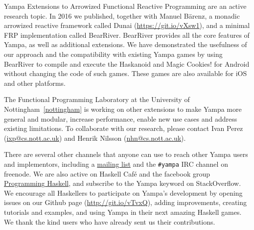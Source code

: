 \begin{hcarentry}[updated]{Yampa}
Extensions to Arrowized Functional Reactive Programming are an active research
topic. In 2016 we published, together with Manuel B\"arenz, a monadic
arrowized reactive framework called Dunai
(\href{https://git.io/vXsw1}{https://git.io/vXsw1}), and a minimal FRP
implementation called BearRiver. BearRiver provides all the core features of
Yampa, as well as additional extensions. We have demonstrated the usefulness
of our approach and the compatibility with existing Yampa games by using
BearRiver to compile and execute the Haskanoid and Magic Cookies! for Android
without changing the code of such games. These games are also available for
iOS and other platforms.

The Functional Programming Laboratory at the University of
Nottingham~\cref{nottingham} is working on other extensions to make Yampa more
general and modular, increase performance, enable new use cases and address
existing limitations. To collaborate with our research, please contact Ivan
Perez (\href{mailto:ixp@cs.nott.ac.uk}{ixp@cs.nott.ac.uk}) and Henrik Nilsson
(\href{mailto:nhn@cs.nott.ac.uk}{nhn@cs.nott.ac.uk}).

There are several other channels that anyone can use to reach other Yampa users
and implementors, including a
\href{http://mailman.cs.yale.edu/mailman/listinfo/yampa-users}{mailing list}
and the \texttt{\#yampa} IRC channel on freenode. We are also active on Haskell
Caf\'e and the facebook group
\href{https://www.facebook.com/groups/programming.haskell/}{Programming
    Haskell}, and subscribe to the Yampa keyword on StackOverflow. We encourage
all Haskellers to participate on Yampa's development by opening issues on our
Github page (\href{http://git.io/vTvxQ}{http://git.io/vTvxQ}), adding
improvements, creating tutorials and examples, and using Yampa in their next
amazing Haskell games. We thank the kind users who have already sent us their
contributions.
\end{hcarentry}
